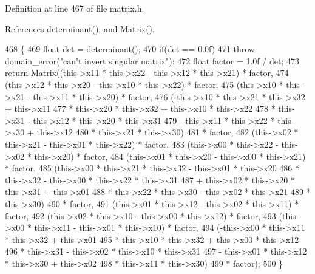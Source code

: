 Definition at line 467 of file matrix.\+h.



References determinant(), and Matrix().


\begin{DoxyCode}
468         \{
469             \textcolor{keywordtype}{float} det = \hyperlink{classMatrix_aadfa353962ca1bf43ed148d79cc71fc6}{determinant}();
470             \textcolor{keywordflow}{if}(det == 0.0f)
471                 \textcolor{keywordflow}{throw} domain\_error(\textcolor{stringliteral}{"can't invert singular matrix"});
472             \textcolor{keywordtype}{float} factor = 1.0f / det;
473             \textcolor{keywordflow}{return} \hyperlink{classMatrix_a2dba13c45127354c9f75ef576f49269b}{Matrix}((this->x11 * this->x22 - this->x12 * this->x21) * factor,
474                     (this->x12 * this->x20 - this->x10 * this->x22) * factor,
475                     (this->x10 * this->x21 - this->x11 * this->x20) * factor,
476                     (-this->x10 * this->x21 * this->x32 + this->x11
477                      * this->x20 * this->x32 + this->x10 * this->x22
478                      * this->x31 - this->x12 * this->x20 * this->x31
479                      - this->x11 * this->x22 * this->x30 + this->x12
480                      * this->x21 * this->x30)
481                     * factor,
482                     (this->x02 * this->x21 - this->x01 * this->x22) * factor,
483                     (this->x00 * this->x22 - this->x02 * this->x20) * factor,
484                     (this->x01 * this->x20 - this->x00 * this->x21) * factor,
485                     (this->x00 * this->x21 * this->x32 - this->x01 * this->x20
486                      * this->x32 - this->x00 * this->x22 * this->x31
487                      + this->x02 * this->x20 * this->x31 + this->x01
488                      * this->x22 * this->x30 - this->x02 * this->x21
489                      * this->x30)
490                     * factor,
491                     (this->x01 * this->x12 - this->x02 * this->x11) * factor,
492                     (this->x02 * this->x10 - this->x00 * this->x12) * factor,
493                     (this->x00 * this->x11 - this->x01 * this->x10) * factor,
494                     (-this->x00 * this->x11 * this->x32 + this->x01
495                      * this->x10 * this->x32 + this->x00 * this->x12
496                      * this->x31 - this->x02 * this->x10 * this->x31
497                      - this->x01 * this->x12 * this->x30 + this->x02
498                      * this->x11 * this->x30)
499                         * factor);
500         \}
\end{DoxyCode}
